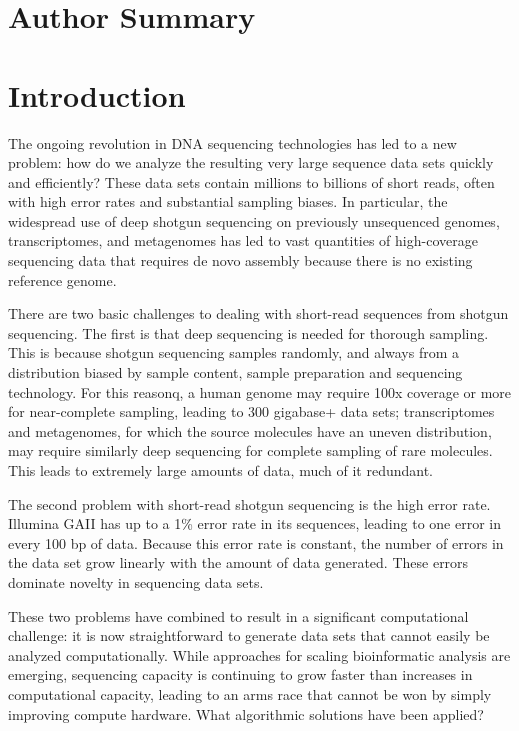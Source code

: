\documentclass[10pt]{article}
\begin{document}
\section*{Author Summary}

\section*{Introduction}

The ongoing revolution in DNA sequencing technologies has led to a new
problem: how do we analyze the resulting very large sequence data sets
quickly and efficiently? These data sets contain millions to billions
of short reads, often with high error rates and substantial sampling
biases. In particular, the widespread use of deep shotgun sequencing
on previously unsequenced genomes, transcriptomes, and metagenomes has
led to vast quantities of high-coverage sequencing data that requires
de novo assembly because there is no existing reference genome.

There are two basic challenges to dealing with short-read sequences
from shotgun sequencing. The first is that deep sequencing is needed
for thorough sampling. This is because shotgun sequencing samples
randomly, and always from a distribution biased by sample content,
sample preparation and sequencing technology.  For this reasonq, a
human genome may require 100x coverage or more for near-complete
sampling, leading to 300 gigabase+ data sets; transcriptomes and
metagenomes, for which the source molecules have an uneven
distribution, may require similarly deep sequencing for complete
sampling of rare molecules. This leads to extremely large amounts of
data, much of it redundant.

The second problem with short-read shotgun sequencing is the high
error rate.  Illumina GAII has up to a 1\% error rate in its sequences,
leading to one error in every 100 bp of data.  Because this error rate
is constant, the number of errors in the data set grow linearly with
the amount of data generated.  These errors dominate novelty in
sequencing data sets.

These two problems have combined to result in a significant
computational challenge: it is now straightforward to generate data
sets that cannot easily be analyzed computationally.  While approaches
for scaling bioinformatic analysis are emerging, sequencing capacity
is continuing to grow faster than increases in computational capacity,
leading to an arms race that cannot be won by simply improving compute
hardware.  What algorithmic solutions have been applied?
\end{document}
